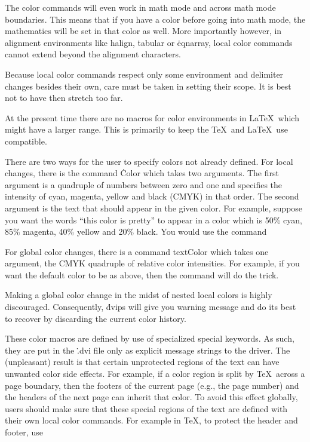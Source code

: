 The color commands will even work in math mode and across math mode
boundaries.  This means that if you have a color before going into
math mode, the mathematics will be set in that color as well.  More
importantly however, in alignment environments like \.{\ttbackslash
halign}, \.{tabular} or \.{eqnarray}, local color commands cannot
extend beyond the alignment characters.
 
Because local color commands respect only some environment and
delimiter changes besides their own, care must be taken in setting
their scope.  It is best not to have then stretch too far.
 
At the present time there are no macros for color environments in
La\TeX\ which might have a larger range.  This is primarily to keep
the \TeX\ and La\TeX\ use compatible. 

 
There are two ways for the user to specify colors not already defined.
For local changes, there is the command \.{\ttbackslash Color} which
takes two arguments.  The first argument is a quadruple of numbers
between zero and one and specifies the intensity of cyan, magenta,
yellow and black (CMYK) in that order.  The second argument is the
text that should appear in the given color.  For example, suppose you
want the words ``this color is pretty'' to appear in a color which is
50\% cyan, 85\% magenta, 40\% yellow and 20\% black.  You would use
the command

For global color changes, there is a command \.{\ttbackslash
textColor} which takes one argument, the CMYK quadruple of relative
color intensities.  For example, if you want the default color to be
as above, then the command
\noindent
will do the trick.
 
Making a global color change in the midst of nested local colors is
highly discouraged.  Consequently, \.{dvips} will give you warning
message and do its best to recover by discarding the current color
history.


These color macros are defined by use of specialized \.{\ttbackslash
special} keywords.  As such, they are put in the \.{.dvi} file only as
explicit message strings to the driver.  The (unpleasant)
result is that certain unprotected regions of the text can have
unwanted color side effects.  For example, if a color region is split
by \TeX\ across a page boundary, then the footers of the current page
(e.g., the page number) and the headers of the next page can inherit
that color.  To avoid this effect globally, users should make sure
that these special regions of the text are defined with their own
local color commands.  For example in \TeX, to protect the header and
footer, use 

